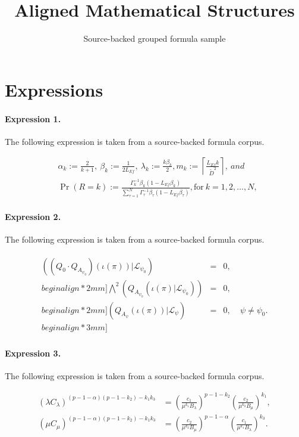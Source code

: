 \documentclass[11pt]{article}
\title{Aligned Mathematical Structures}
\author{Source-backed grouped formula sample}
\date{}
\begin{document}
\maketitle
\section{Expressions}
\paragraph{Expression 1.} The following expression is taken from a source-backed formula corpus.

\begin{align*} &\alpha_k:=\frac{2}{k+1},\ \beta_k:=\frac{1}{2L_{Ef}},\ \lambda_k:=\frac{k\beta_k}{2}, m_k:=\left\lceil \frac{L_{Ef}k}{\tilde{D}^2}\right\rceil,\ and \\ &\Pr(R=k):=\frac{\Gamma_k^{-1}\beta_k(1-L_{Ef}\beta_k)}{\sum_{{\tau}=1}^N \Gamma_{\tau}^{-1} \beta_{\tau} (1-L_{Ef}\beta_{\tau})}, \mathrm{for} \ k=1,2,\dots,N, \end{align*}

\paragraph{Expression 2.} The following expression is taken from a source-backed formula corpus.

\begin{align*}\begin{array}{rrrr}((Q_0 \cdot Q_{A_{\psi_0}})(\iota(\pi)) | \mathcal{L}_{\psi_0}) & = & 0, &\\begin{align*}2mm]\bigwedge^{2}(Q_{A_{\psi_0}}(\iota(\pi) | \mathcal{L}_{\psi_0})) & = & 0, &\\begin{align*}2mm](Q_{A_{\psi}}(\iota(\pi)) | \mathcal{L}_{\psi}) & = & 0, & \;\psi \neq \psi_0.\\begin{align*}3mm]\end{array}\end{align*}

\paragraph{Expression 3.} The following expression is taken from a source-backed formula corpus.

\begin{align*}(\lambda C_\lambda)^{(p-1-\alpha)(p-1-k_2)-k_1k_3} &=\left( \frac{c_1}{\mu^{k_1} B_\lambda} \right)^{p-1-k_2}\left( \frac{c_2}{\mu^{k_2} B_\mu} \right)^{k_1}, \\(\mu C_\mu)^{(p-1-\alpha)(p-1-k_2)-k_1k_3} &=\left( \frac{c_2}{\mu^{k_2} B_\mu} \right)^{p-1-\alpha}\left( \frac{c_1}{\mu^{k_1} B_\lambda} \right)^{k_3}.\end{align*}
\end{document}
